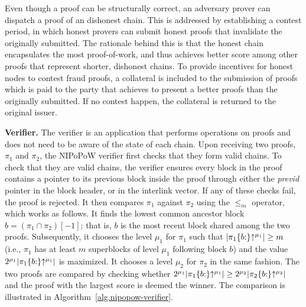 Even though a proof can be structurally correct, an adversary prover can dispatch a
proof of an dishonest chain. This is addressed by establishing a contest
period, in which honest provers can submit honest proofs that invalidate
the originally submitted. The rationale behind this is that the honest chain
encapsulates the most proof-of-work, and thus achieves better score among
other proofs that represent shorter, dishonest chains. To provide incentives for honest
nodes to contest fraud proofs, a collateral is included to the submission of
proofs which is paid to the party that achieves to present a better proofs than
the originally submitted. If no contest happen, the collateral is returned to
the original issuer.







\noindent \textbf{Verifier.} The verifier is an application that performs
operations on proofs and does not need to be aware of the state of each chain.
Upon receiving two proofs, $\pi_1$ and $\pi_2$, the NIPoPoW verifier first
checks that they form valid chains. To check that they are valid chains, the
verifier ensures every block in the proof contains a pointer to its previous
block inside the proof through either the \emph{previd} pointer in the block
header, or in the interlink vector. If any of these checks fail, the proof is
rejected.  It then compares $\pi_1$ against $\pi_2$ using the $\leq_m$
operator, which works as follows. It finds the lowest common ancestor block $b
= (\pi_1 \cap \pi_2)[-1]$; that is, $b$ is the most recent block shared among
the two proofs.  Subsequently, it chooses the level $\mu_1$ for $\pi_1$ such
that $\lvert \pi_1\{b{:}\}\negthickspace\uparrow^{\mu_1} \rvert \geq m$ (i.e., $\pi_1$ has at
least $m$ superblocks of level $\mu_1$ following block $b$) and the value
$2^{\mu_1} \lvert \pi_1\{b{:}\}\negthickspace\uparrow^{\mu_1} \rvert$ is maximized.  It
chooses a level $\mu_2$ for $\pi_2$ in the same fashion. The two proofs are
compared by checking whether $2^{\mu_1} \lvert \pi_1\{b{:}\}\negthickspace\uparrow^{\mu_1}
\rvert \geq 2^{\mu_2} \lvert \pi_2\{b{:}\}\negthickspace\uparrow^{\mu_2} \rvert$ and the
proof with the largest score is deemed the winner. The comparison is
illustrated in Algorithm~\ref{alg.nipopow-verifier}.

